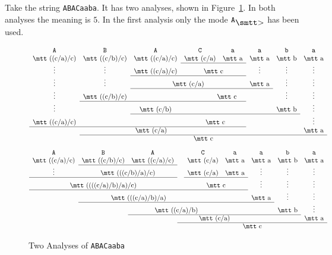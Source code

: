 Take the string {\tt ABACaaba}. It has two analyses, shown in 
Figure~\ref{fig:abac}. In both analyses the meaning is $5$. In 
the first analysis only the mode $\mbox{\tt A}_{\sgr}$ has been used. 
\begin{figure}
$$\begin{array}{cccccccc}
\mbox{\tt A} & \mbox{\tt B} & \mbox{\tt A} & \mbox{\tt C} &
    \mbox{\tt a} & \mbox{\tt a}
    & \mbox{\tt b} & \mbox{\tt a} \\
\mbox{\mtt ((c{\tf}a){\tf}c)} & \mbox{\mtt ((c{\tf}b){\tf}c)} 
	& \mbox{\mtt ((c{\tf}a){\tf}c)} & \mbox{\mtt (c{\tf}a)} 
	& \mbox{\mtt a} & \mbox{\mtt a} & \mbox{\mtt b} 
	& \mbox{\mtt a} \\\cline{4-5}
\vdots  & \vdots & \mbox{\mtt ((c{\tf}a){\tf}c)} 
	& \multicolumn{2}{c}{\mbox{\mtt c}} & \vdots & \vdots
    & \vdots
        \\\cline{3-5}
\vdots  & \vdots  & \multicolumn{3}{c}{\mbox{\mtt (c{\tf}a)}} 
         & \mbox{\mtt a} & \vdots &
\vdots
        \\\cline{3-6}
\vdots  & \mbox{\mtt ((c{\tf}b){\tf}c)} &  & 
	\multicolumn{3}{c}{\mbox{\mtt c}}   & \vdots  & \vdots
        \\\cline{2-5}
\vdots  &         & \mbox{\mtt (c{\tf}b)} & & &  & \mbox{\mtt b} & \vdots
        \\\cline{3-7}
\mbox{\mtt ((c{\tf}a){\tf}c)} &  
	& \multicolumn{5}{c}{\mbox{\mtt c}}             & \vdots
\\\cline{1-5}
\multicolumn{6}{c}{\mbox{\mtt (c{\tf}a)}} & & \mbox{\mtt a} 
	\\\cline{2-8}
        &       
\multicolumn{7}{c}{\mbox{\mtt c}}
\end{array}$$
$$\begin{array}{ccccccccc}
\mbox{\tt A} & \mbox{\tt B} & \mbox{\tt A} & & \mbox{\tt C} &
    \mbox{\tt a} & \mbox{\tt a}
    & \mbox{\tt b} & \mbox{\tt a} \\
\mbox{\mtt ((c/a)/c)} & \mbox{\mtt ((c/b)/c)} 
	& \mbox{\mtt ((c{\tf}a){\tf}c)} & & \mbox{\mtt (c{\tf}a)} 
	& \mbox{\mtt a} & \mbox{\mtt a} & \mbox{\mtt b} 
	& \mbox{\mtt a} \\\cline{2-3}
\vdots  & \multicolumn{2}{c}{\mbox{\mtt (((c{\tf}b){\tf}a){\tf}c)}} 
	& & \mbox{\mtt (c{\tf}a)} & \mbox{\mtt a}
    & \vdots & \vdots & \vdots
        \\\cline{1-3}\cline{5-6}
\multicolumn{3}{c}{\mbox{\mtt ((((c{\tf}a){\tf}b){\tf}a){\tf}c)}}   
	&  & \multicolumn{2}{c}{\mbox{\mtt c}} &
    \vdots & \vdots & \vdots
        \\\cline{1-6}
\multicolumn{6}{c}{\mbox{\mtt (((c{\tf}a){\tf}b){\tf}a)}}   
	& \mbox{\mtt a} & \vdots & \vdots
        \\\cline{2-7}
        &
\multicolumn{6}{c}{\mbox{\mtt ((c{\tf}a){\tf}b)}} & \mbox{\mtt b} 
	& \vdots \\\cline{3-8}
        & &
\multicolumn{6}{c}{\mbox{\mtt (c{\tf}a)}}             & \mbox{\mtt a}
        \\\cline{4-9}
        & & &
\multicolumn{6}{c}{\mbox{\mtt c}}
\end{array}$$
\caption{Two Analyses of {\tt ABACaaba}}
\label{fig:abac}
\end{figure}
